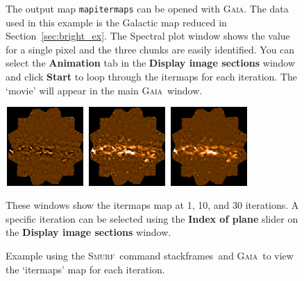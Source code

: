 \documentclass[twoside,11pt]{article}
\newcommand{\htmlref}[2]{#1}
\newenvironment{latexonly}{}{}
\newcommand{\latexhtml}[2]{#1}
\newcommand{\xref}[3]{#1}
\renewcommand{\_}{\texttt{\symbol{95}}}
\newenvironment{fmpage}[1]{\begin{lrbox}{\fmbox}\begin{minipage}{#1}}{\end{minipage}\end{lrbox}\fbox{\usebox{\fmbox}}}
\newcommand{\gaia}{\xref{\textsc{Gaia}}{sun214}{}}
\newcommand{\smurf}{\xref{\textsc{Smurf}}{sun258}{}}
\newcommand{\task}[1]{\textsf{#1}}
\newcommand{\file}[1]{\texttt{#1}}
\newcommand{\gaiathing}[1]{\textbf{\textsf{#1}}}
\newcommand{\stackframes}{\xref{\task{stackframes}}{sun258}{STACKFRAMES}}
\newcommand{\cref}[3]{\latexhtml{#1~\ref{#2}}{\htmlref{#3}{#2}}}
\begin{document}
\begin{latexonly}
\begin{figure}[ht!]
\begin{center}
\begin{fmpage}{0.95\linewidth}
\begin{minipage}[c]{0.65\linewidth}
\end{minipage}
\hspace{0.3cm}
\begin{minipage}[c]{0.29\linewidth}
The output map \file{map\_itermaps} can be opened with \gaia. The data used
in this example is the Galactic map reduced in
\cref{Section}{sec:bright_ex}{\file{dimmconfig\_bright\_extended.lis}}. The
Spectral plot window shows the value for a single pixel and the three
chunks are easily identified. You can select the \gaiathing{Animation} tab
in the \gaiathing{Display image sections} window and click
\gaiathing{Start} to loop through the itermaps for each iteration.  The
`movie' will appear in the main \gaia\ window.
\end{minipage}

\vspace{0.7cm}

\begin{minipage}[c]{0.65\linewidth}
\centering
\hspace{0.5mm}
\includegraphics[width=3cm, height=3cm]{sc21_iter1}
\includegraphics[width=3cm, height=3cm]{sc21_iter2}
\includegraphics[width=3cm, height=3cm]{sc21_iter31}
\vspace{0.2cm}
\end{minipage}
\hspace{0.3cm}
\begin{minipage}[c]{0.29\linewidth}
These windows show the itermaps map at 1, 10, and 30 iterations. A
specific iteration can be selected using the \gaiathing{Index of plane}
slider on the \gaiathing{Display image sections} window.
\vspace{0.2cm}
\end{minipage}
\end{fmpage}
\end{center}
\caption[View maps for each iteration]{
  \small Example using the \smurf\ command \stackframes\ and
  \gaia\ to view the `itermaps' map for each iteration.
}
\label{fig:stack}
\end{figure}
\end{latexonly}
\end{document}

